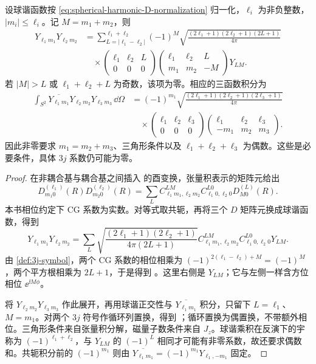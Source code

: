 \begin{proposition}
设球谐函数按 \cref{eq:spherical-harmonic-D-normalization} 归一化，$\ell_i$ 为非负整数，$|m_i|\le\ell_i$。记 $M=m_1+m_2$，则
\begin{align}
Y_{\ell_1m_1}Y_{\ell_2m_2}
&=\sum_{L=|\ell_1-\ell_2|}^{\ell_1+\ell_2}
(-1)^M\sqrt{\frac{(2\ell_1+1)(2\ell_2+1)(2L+1)}{4\pi}}
\nonumber\\
&\quad\times
\begin{pmatrix}\ell_1&\ell_2&L\\0&0&0\end{pmatrix}
\begin{pmatrix}\ell_1&\ell_2&L\\m_1&m_2&-M\end{pmatrix}Y_{LM}.
\label{eq:gaunt-product-correct-phase}
\end{align}
若 $|M|>L$ 或 $\ell_1+\ell_2+L$ 为奇数，该项为零。相应的三函数积分为
\begin{align}
\int_{S^2}\overline{Y_{\ell_1m_1}}Y_{\ell_2m_2}Y_{\ell_3m_3}\,\dd\Omega
&=(-1)^{m_1}\sqrt{\frac{(2\ell_1+1)(2\ell_2+1)(2\ell_3+1)}{4\pi}}
\nonumber\\
&\quad\times
\begin{pmatrix}\ell_1&\ell_2&\ell_3\\0&0&0\end{pmatrix}
\begin{pmatrix}\ell_1&\ell_2&\ell_3\\-m_1&m_2&m_3\end{pmatrix}.
\label{eq:gaunt-integral-conjugate-phase}
\end{align}
因此非零要求 $m_1=m_2+m_3$、三角形条件以及 $\ell_1+\ell_2+\ell_3$ 为偶数。这些是必要条件，具体 $3j$ 系数仍可能为零。
\label{prop:gaunt-spherical-product}
\end{proposition}

\begin{proof}
在非耦合基与耦合基之间插入  的酉变换，张量积表示的矩阵元给出
\[
D^{(\ell_1)}_{m_1 0}(R)D^{(\ell_2)}_{m_2 0}(R)
=\sum_L C^{LM}_{\ell_1m_1,\ell_2m_2}
C^{L0}_{\ell_1 0,\ell_2 0}D^{(L)}_{M0}(R).
\]
本书相位约定下 CG 系数为实数。对等式取共轭，再将三个 $D$ 矩阵元换成球谐函数，得到
\[
Y_{\ell_1m_1}Y_{\ell_2m_2}
=\sum_L\sqrt{\frac{(2\ell_1+1)(2\ell_2+1)}{4\pi(2L+1)}}
C^{LM}_{\ell_1m_1,\ell_2m_2}C^{L0}_{\ell_1 0,\ell_2 0}Y_{LM}.
\]
由 \cref{def:3j-symbol}，两个 CG 系数的相位相乘为
$(-1)^{2(\ell_1-\ell_2)+M}=(-1)^M$，两个平方根相乘为 $2L+1$，于是得到 。这里右侧是 $Y_{LM}$；它与左侧一样含方位相位 $\ee^{\ii M\phi}$。

将 $Y_{\ell_2m_2}Y_{\ell_3m_3}$ 作此展开，再用球谐正交性与 $\overline{Y_{\ell_1m_1}}$ 积分，只留下 $L=\ell_1$、$M=m_1$。对两个 $3j$ 符号作循环列置换，得到 ；循环置换为偶置换，不带额外相位。三角形条件来自张量积分解，磁量子数条件来自 $J_z$。球谐乘积在反演下的宇称为 $(-1)^{\ell_1+\ell_2}$，与 $Y_{LM}$ 的 $(-1)^L$ 相同才可能有非零系数，故还要求偶数和。共轭积分前的 $(-1)^{m_1}$ 则由 $\overline{Y_{\ell_1m_1}}=(-1)^{m_1}Y_{\ell_1,-m_1}$ 固定。
\end{proof}

